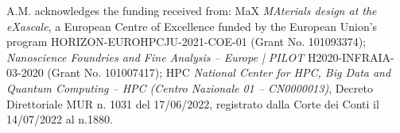 A.M. acknowledges the funding received from: MaX {\em MAterials design at the eXascale}, a European Centre of Excellence funded by the European Union’s program
HORIZON-EUROHPCJU-2021-COE-01 (Grant No.  101093374); {\em Nanoscience Foundries and Fine Analysis -- Europe | PILOT} H2020-INFRAIA-03-2020 (Grant No.
101007417); HPC {\em National Center for HPC, Big Data and Quantum Computing – HPC (Centro Nazionale 01 – CN0000013)}, Decreto Direttoriale MUR n. 1031 del
17/06/2022, registrato dalla Corte dei Conti il 14/07/2022 al n.1880.
